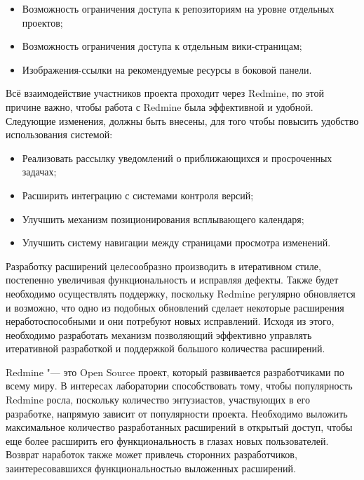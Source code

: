 \begin{itemize}
  \item Возможность ограничения доступа к репозиториям на уровне отдельных
  проектов;
  \item Возможность ограничения доступа к отдельным вики-страницам;
  \item Изображения-ссылки на рекомендуемые ресурсы в боковой панели.
\end{itemize} 
   
Всё взаимодействие участников проекта проходит через Redmine, по этой причине
важно, чтобы работа с Redmine была эффективной и удобной. Следующие изменения,
должны быть внесены, для того чтобы повысить удобство использования системой:
\begin{itemize}
  \item Реализовать рассылку уведомлений о приближающихся и просроченных
  задачах;
  \item Расширить интеграцию с системами контроля версий; 
  \item Улучшить механизм позиционирования всплывающего календаря;
  \item Улучшить систему навигации между страницами просмотра изменений.
\end{itemize}

Разработку расширений целесообразно производить в итеративном стиле, постепенно
увеличивая функциональность и исправляя дефекты. Также будет необходимо
осуществлять поддержку, поскольку Redmine регулярно обновляется и возможно,
что одно из подобных обновлений сделает некоторые расширения
неработоспособными и они потребуют новых исправлений. Исходя из этого,
необходимо разработать механизм позволяющий эффективно управлять 
итеративной разработкой и поддержкой большого количества расширений.

Redmine "--- это Open Source проект, который развивается разработчиками по
всему миру. В интересах лаборатории способствовать тому, чтобы популярность
Redmine росла, поскольку количество энтузиастов, участвующих в его разработке,
напрямую зависит от популярности проекта. Необходимо выложить максимальное
количество разработанных расширений в открытый доступ, чтобы еще более
расширить его функциональность в глазах новых пользователей. Возврат наработок
также может привлечь сторонних разработчиков, заинтересовавшихся
функциональностью выложенных расширений.



